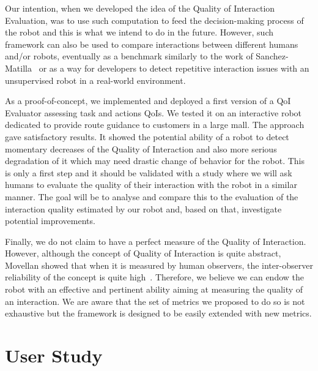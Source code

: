 \documentclass[a4paper,11pt,twoside]{StyleThese}
\begin{document}
Our intention, when we developed the idea of the Quality of Interaction Evaluation, was to use such computation to feed the decision-making process of the robot and this is what we intend to do in the future. However, such framework can also be used to compare interactions between different humans and/or robots, eventually as a benchmark similarly to the work of Sanchez-Matilla~\cite{sanchez} or as a way for developers to detect repetitive interaction issues with an unsupervised robot in a real-world environment.

As a proof-of-concept, we implemented and deployed a first version of a QoI Evaluator assessing task and actions QoIs. We tested it on an interactive robot dedicated to provide route guidance to customers in a large mall. The approach gave satisfactory results. It showed the potential ability of a robot to detect momentary decreases of the Quality of Interaction and also more serious degradation of it which may need drastic change of behavior for the robot. This is only a first step and it should be validated with a study where we will ask humans to evaluate the quality of their interaction with the robot in a similar manner. The goal will be to analyse and compare this to the evaluation of the interaction quality estimated by our robot and, based on that, investigate potential improvements. 

Finally, we do not claim to have a perfect measure of the Quality of Interaction. However, although the concept of Quality of Interaction is quite abstract, Movellan \etal{} showed that when it is measured by human observers, the inter-observer reliability of the concept is quite high~\cite{movellan2007rubi}. Therefore, we believe we can endow the robot with an effective and pertinent ability aiming at measuring the quality of an interaction. We are aware that the set of metrics we proposed to do so is not exhaustive but the framework is designed to be easily extended with new metrics.

\section{User Study}

\ifdefined{}
\else


\end{document}
